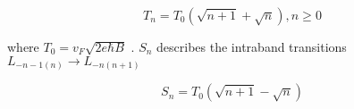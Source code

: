 \documentclass[prl,aps,superscriptaddress,preprint]{revtex4-1}
\begin{document}
\begin{equation}
T_n = T_0\left(\sqrt{n+1}+\sqrt{n}\right), n\geq 0
\end{equation}

where $T_0 = v_F\sqrt{2e\hbar B}$ . $S_n$ describes the intraband transitions $L_{-n-1(n)}\rightarrow L_{-n(n+1)}$ 

\begin{equation}
S_n = T_0\left(\sqrt{n+1}-\sqrt{n}\right)
\end{equation}


%
%

%



\end{document}
